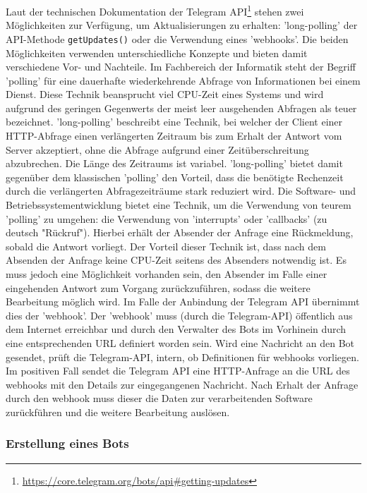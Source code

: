 Laut der technischen Dokumentation der Telegram API\footnote{\url{https://core.telegram.org/bots/api\#getting-updates}} stehen zwei Möglichkeiten zur Verfügung, um Aktualisierungen zu erhalten: 'long-polling' der API-Methode \lstinline{getUpdates()} oder die Verwendung eines 'webhooks'. Die beiden Möglichkeiten verwenden unterschiedliche Konzepte und bieten damit verschiedene Vor- und Nachteile. Im Fachbereich der Informatik steht der Begriff 'polling' für eine dauerhafte wiederkehrende Abfrage von Informationen bei einem Dienst. Diese Technik beansprucht viel CPU-Zeit eines Systems und wird aufgrund des geringen Gegenwerts der meist leer ausgehenden Abfragen als teuer bezeichnet. 'long-polling' beschreibt eine Technik, bei welcher der Client einer HTTP-Abfrage einen verlängerten Zeitraum bis zum Erhalt der Antwort vom Server akzeptiert, ohne die Abfrage aufgrund einer Zeitüberschreitung abzubrechen. Die Länge des Zeitraums ist variabel. 'long-polling' bietet damit gegenüber dem klassischen 'polling' den Vorteil, dass die benötigte Rechenzeit durch die verlängerten Abfragezeiträume stark reduziert wird. Die Software- und Betriebssystementwicklung bietet eine Technik, um die Verwendung von teurem 'polling' zu umgehen: die Verwendung von 'interrupts' oder 'callbacks' (zu deutsch "Rückruf"). Hierbei erhält der Absender der Anfrage eine Rückmeldung, sobald die Antwort vorliegt. Der Vorteil dieser Technik ist, dass nach dem Absenden der Anfrage keine CPU-Zeit seitens des Absenders notwendig ist. Es muss jedoch eine Möglichkeit vorhanden sein, den Absender im Falle einer eingehenden Antwort zum Vorgang zurückzuführen, sodass die weitere Bearbeitung möglich wird. Im Falle der Anbindung der Telegram API übernimmt dies der 'webhook'. Der 'webhook' muss (durch die Telegram-API) öffentlich aus dem Internet erreichbar und durch den Verwalter des Bots im Vorhinein durch eine entsprechenden URL definiert worden sein. Wird eine Nachricht an den Bot gesendet, prüft die Telegram-API, intern, ob Definitionen für webhooks vorliegen. Im positiven Fall sendet die Telegram API eine HTTP-Anfrage an die URL des webhooks mit den Details zur eingegangenen Nachricht. Nach Erhalt der Anfrage durch den webhook muss dieser die Daten zur verarbeitenden Software zurückführen und die weitere Bearbeitung auslösen.

\subsubsection{Erstellung eines Bots}

